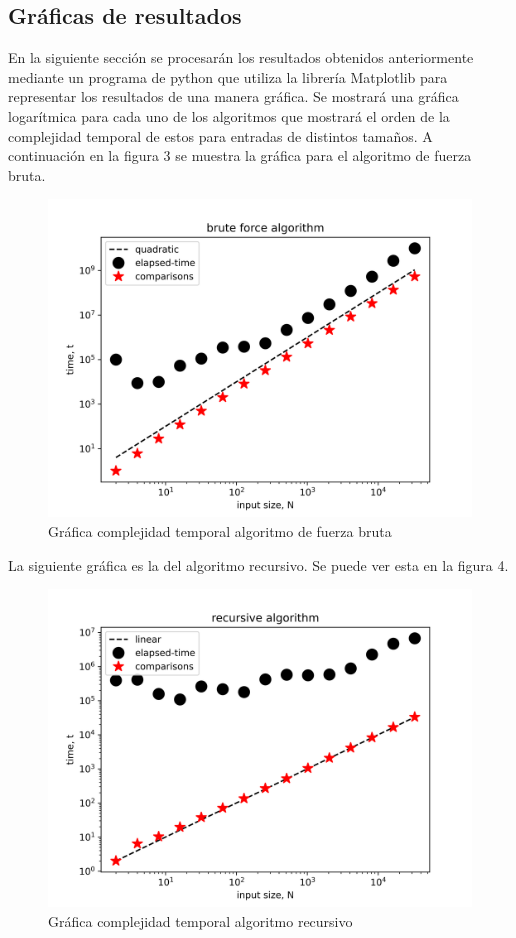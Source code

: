 \subsection{Gráficas de resultados}
En la siguiente sección se procesarán los resultados obtenidos anteriormente mediante un programa de python que utiliza la librería Matplotlib para representar los resultados de una manera gráfica. Se mostrará una gráfica logarítmica para cada uno de los algoritmos que mostrará el orden de la complejidad temporal de estos para entradas de distintos tamaños. A continuación en la figura 3 se muestra la gráfica para el algoritmo de fuerza bruta.\\
\begin{figure}[!htbp]
    \centering
    \includegraphics[width=.7\textwidth,height=.5\textwidth]{figures/brute force.png}
    \caption{Gráfica complejidad temporal algoritmo de fuerza bruta}
    \label{fig:my_label}
\end{figure}
La siguiente gráfica es la del algoritmo recursivo. Se puede ver esta en la figura 4.\\
\begin{figure}[!htbp]
    \centering
    \includegraphics[width=.7\textwidth,height=.5\textwidth]{figures/recursive.png}
    \caption{Gráfica complejidad temporal algoritmo recursivo}
    \label{fig:my_label}
\end{figure}